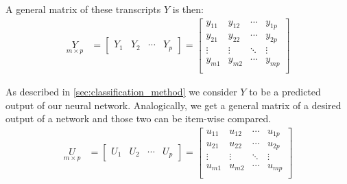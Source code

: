 A general matrix of these transcripts $ Y $ is then:
\begin{align*}
\underset{m\times p}{Y} &= 
\begin{bmatrix}
    Y_1 & Y_2 & \cdots & Y_p
\end{bmatrix} =
\begin{bmatrix}
    y_{11} & y_{12} & \cdots & y_{1p} \\
    y_{21} & y_{22} & \cdots & y_{2p} \\
    \vdots & \vdots & \ddots & \vdots \\
    y_{m1} & y_{m2} & \cdots & y_{mp} \\      
\end{bmatrix}
\end{align*}

As described in \cref{sec:classification_method} we consider $ Y $ to be a predicted output of our neural network. Analogically, we get a general matrix of a desired output of a network and those two can be item-wise compared.
\begin{align*}
\underset{m\times p}{U} &= 
\begin{bmatrix}
    U_1 & U_2 & \cdots & U_p
\end{bmatrix} =
\begin{bmatrix}
    u_{11} & u_{12} & \cdots & u_{1p} \\
    u_{21} & u_{22} & \cdots & u_{2p} \\
    \vdots & \vdots & \ddots & \vdots \\
    u_{m1} & u_{m2} & \cdots & u_{mp} \\      
\end{bmatrix}
\end{align*}

